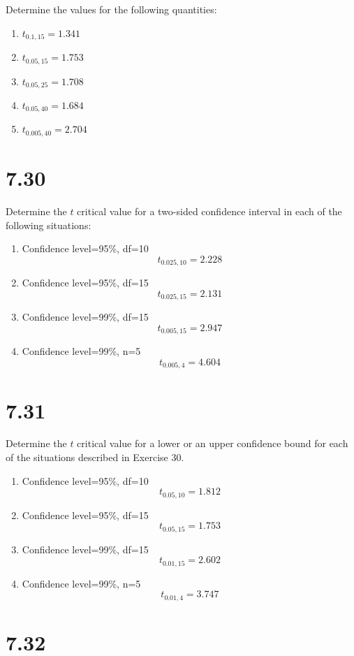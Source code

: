 \documentclass[letterpaper,12pt,fleqn]{article}
\newcommand{\td}[2]{t_{{#1},{#2}}}
\begin{document}
Determine the values for the following quantities:
\begin{enumerate}[label={\alph*)}]
\item \(\td{0.1}{15}=1.341\)
\item \(\td{0.05}{15}=1.753\)
\item \(\td{0.05}{25}=1.708\)
\item \(\td{0.05}{40}=1.684\)
\item \(\td{0.005}{40}=2.704\)
\end{enumerate}

\section*{7.30}

Determine the \(t\) critical value for a two-sided confidence interval in each of the following situations:
\begin{enumerate}[label={\alph*)}]
\item Confidence level=95\%, df=10
  \[\td{0.025}{10}=2.228\]
\item Confidence level=95\%, df=15
  \[\td{0.025}{15}=2.131\]
\item Confidence level=99\%, df=15
  \[\td{0.005}{15}=2.947\]
\item Confidence level=99\%, n=5
  \[\td{0.005}{4}=4.604\]
\end{enumerate}

\section*{7.31}

Determine the \(t\) critical value for a lower or an upper confidence bound for each of the situations described in
Exercise 30.
\begin{enumerate}[label={\alph*)}]
\item Confidence level=95\%, df=10
  \[\td{0.05}{10}=1.812\]
\item Confidence level=95\%, df=15
  \[\td{0.05}{15}=1.753\]
\item Confidence level=99\%, df=15
  \[\td{0.01}{15}=2.602\]
\item Confidence level=99\%, n=5
  \[\td{0.01}{4}=3.747\]
\end{enumerate}

\section*{7.32}
\end{document}
